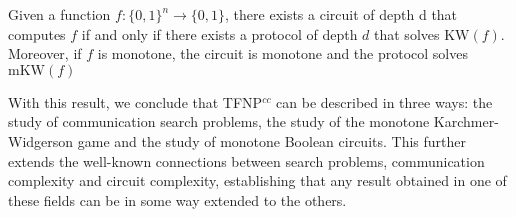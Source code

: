 \begin{theorem}
    Given a function $f : \{0, 1\}^n \to \{0, 1\}$, there exists a circuit of depth d that computes $f$ if and only if there exists a protocol of depth $d$ that solves $\mathrm{KW}(f)$. Moreover, if $f$ is monotone, the circuit is monotone and the protocol solves $\mathrm{mKW}(f)$

\end{theorem}

With this result, we conclude that \textsf{TFNP}$^{cc}$ can be described in three ways: the study of communication search problems, the study of the monotone Karchmer-Widgerson game and the study of monotone Boolean circuits. This further extends the well-known connections between search problems, communication complexity and circuit complexity, establishing that any result obtained in one of these fields can be in some way extended to the others. 



\cleardoublepage
